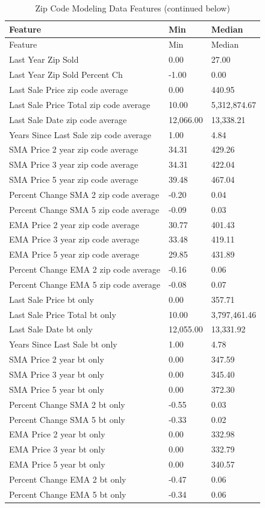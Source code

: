 \documentclass[12pt,]{article}
\begin{document}
\begin{longtable}[]{@{}lll@{}}
\caption{Zip Code Modeling Data Features (continued
below)}\tabularnewline
\toprule
Feature & Min & Median\tabularnewline
\midrule
\endfirsthead
\toprule
Feature & Min & Median\tabularnewline
\midrule
\endhead
Last Year Zip Sold & 0.00 & 27.00\tabularnewline
Last Year Zip Sold Percent Ch & -1.00 & 0.00\tabularnewline
Last Sale Price zip code average & 0.00 & 440.95\tabularnewline
Last Sale Price Total zip code average & 10.00 &
5,312,874.67\tabularnewline
Last Sale Date zip code average & 12,066.00 & 13,338.21\tabularnewline
Years Since Last Sale zip code average & 1.00 & 4.84\tabularnewline
SMA Price 2 year zip code average & 34.31 & 429.26\tabularnewline
SMA Price 3 year zip code average & 34.31 & 422.04\tabularnewline
SMA Price 5 year zip code average & 39.48 & 467.04\tabularnewline
Percent Change SMA 2 zip code average & -0.20 & 0.04\tabularnewline
Percent Change SMA 5 zip code average & -0.09 & 0.03\tabularnewline
EMA Price 2 year zip code average & 30.77 & 401.43\tabularnewline
EMA Price 3 year zip code average & 33.48 & 419.11\tabularnewline
EMA Price 5 year zip code average & 29.85 & 431.89\tabularnewline
Percent Change EMA 2 zip code average & -0.16 & 0.06\tabularnewline
Percent Change EMA 5 zip code average & -0.08 & 0.07\tabularnewline
Last Sale Price bt only & 0.00 & 357.71\tabularnewline
Last Sale Price Total bt only & 10.00 & 3,797,461.46\tabularnewline
Last Sale Date bt only & 12,055.00 & 13,331.92\tabularnewline
Years Since Last Sale bt only & 1.00 & 4.78\tabularnewline
SMA Price 2 year bt only & 0.00 & 347.59\tabularnewline
SMA Price 3 year bt only & 0.00 & 345.40\tabularnewline
SMA Price 5 year bt only & 0.00 & 372.30\tabularnewline
Percent Change SMA 2 bt only & -0.55 & 0.03\tabularnewline
Percent Change SMA 5 bt only & -0.33 & 0.02\tabularnewline
EMA Price 2 year bt only & 0.00 & 332.98\tabularnewline
EMA Price 3 year bt only & 0.00 & 332.79\tabularnewline
EMA Price 5 year bt only & 0.00 & 340.57\tabularnewline
Percent Change EMA 2 bt only & -0.47 & 0.06\tabularnewline
Percent Change EMA 5 bt only & -0.34 & 0.06\tabularnewline
\bottomrule
\end{longtable}
\end{document}
